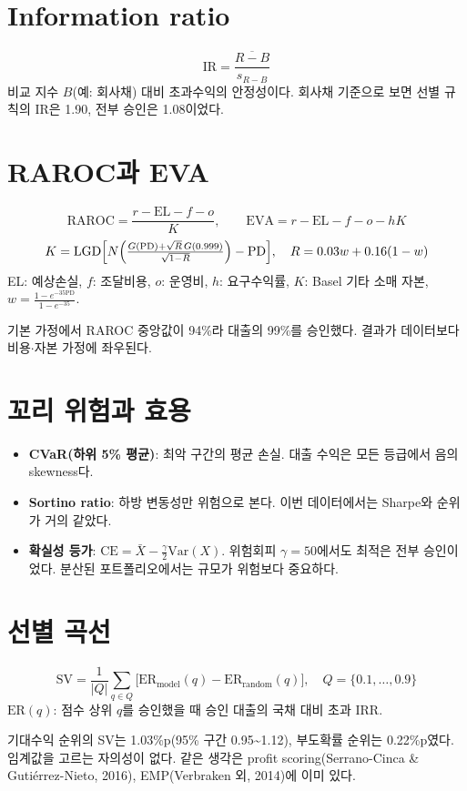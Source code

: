 \documentclass[11pt]{report}
\begin{document}
\section{Information ratio}
\[ \mathrm{IR}=\frac{\overline{R-B}}{s_{R-B}} \]
비교 지수 $B$(예: 회사채) 대비 초과수익의 안정성이다. 회사채 기준으로 보면 선별 규칙의 IR은 1.90, 전부 승인은 1.08이었다.

\section{RAROC과 EVA}
\begin{formulabox}[은행 관점]
\[ \mathrm{RAROC}=\frac{r-\mathrm{EL}-f-o}{K},\qquad \mathrm{EVA}=r-\mathrm{EL}-f-o-hK \]
\[ K=\mathrm{LGD}\Bigl[N\Bigl(\tfrac{G(\mathrm{PD})+\sqrt{R}\,G(0.999)}{\sqrt{1-R}}\Bigr)-\mathrm{PD}\Bigr],\quad R=0.03w+0.16(1-w) \]
EL: 예상손실, $f$: 조달비용, $o$: 운영비, $h$: 요구수익률, $K$: Basel 기타 소매 자본, $w=\frac{1-e^{-35\mathrm{PD}}}{1-e^{-35}}$.
\end{formulabox}
\begin{warnbox}[주 지표로 쓰지 않은 이유]
기본 가정에서 RAROC 중앙값이 94\%라 대출의 99\%를 승인했다. 결과가 데이터보다 비용\ensuremath{\cdot}자본 가정에 좌우된다.
\end{warnbox}

\section{꼬리 위험과 효용}
\begin{itemize}
\item \textbf{CVaR(하위 5\% 평균)}: 최악 구간의 평균 손실. 대출 수익은 모든 등급에서 음의 skewness다.
\item \textbf{Sortino ratio}: 하방 변동성만 위험으로 본다. 이번 데이터에서는 Sharpe와 순위가 거의 같았다.
\item \textbf{확실성 등가}: $\mathrm{CE}=\bar X-\tfrac{\gamma}{2}\mathrm{Var}(X)$. 위험회피 $\gamma=50$에서도 최적은 전부 승인이었다. 분산된 포트폴리오에서는 규모가 위험보다 중요하다.
\end{itemize}

\section{선별 곡선}
\begin{formulabox}[선별 가치]
\[ \mathrm{SV}=\frac{1}{|Q|}\sum_{q\in Q}\bigl[\mathrm{ER}_{\text{model}}(q)-\mathrm{ER}_{\text{random}}(q)\bigr],\quad Q=\{0.1,\dots,0.9\} \]
$\mathrm{ER}(q)$: 점수 상위 $q$를 승인했을 때 승인 대출의 국채 대비 초과 IRR.
\end{formulabox}
기대수익 순위의 SV는 1.03\%p(95\% 구간 0.95\textasciitilde 1.12), 부도확률 순위는 0.22\%p였다. 임계값을 고르는 자의성이 없다. 같은 생각은 profit scoring(Serrano-Cinca \& Gutiérrez-Nieto, 2016), EMP(Verbraken 외, 2014)에 이미 있다.
\end{document}
